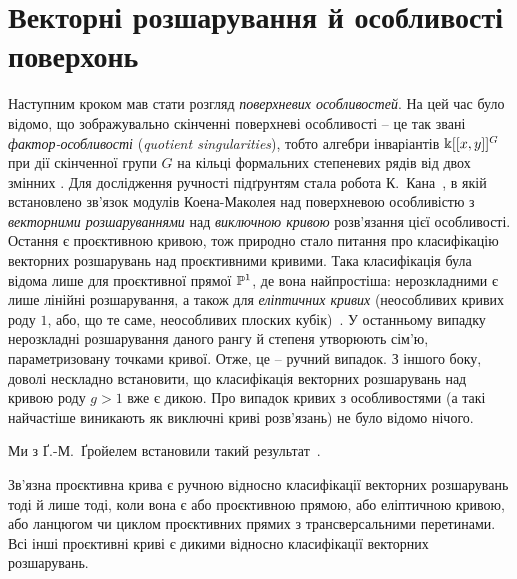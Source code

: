\section{Векторні розшарування й особливості поверхонь}
Наступним кроком мав стати розгляд \emph{поверхневих особливостей}. 
На цей час було відомо, що зображувально скінченні поверхневі особливості -- це так звані \emph{фактор-особливості} (\emph{quotient singularities}), тобто алгебри інваріантів $\Bbbk[[x,y]]^G$ при дії скінченної групи $G$ на кільці формальних степеневих рядів від двох змінних \cite{Aus-quot,Esnault}. 
Для дослідження ручності підґрунтям стала робота К.~Кана~\cite{Kahn}, в якій встановлено зв'язок модулів Коена-Маколея над поверхневою особливістю з \emph{векторними розшаруваннями} над \emph{виключною кривою} розв'язання цієї особливості. 
Остання є проєктивною кривою, тож природно стало питання про класифікацію векторних розшарувань над проєктивними кривими. 
Така класифікація була відома лише для проєктивної прямої $\mathbb{P}^1$, де вона найпростіша: нерозкладними є лише лінійні розшарування, а також для \emph{еліптичних кривих} (неособливих кривих роду $1$, або, що те саме, неособливих плоских кубік)~\cite{Atiyah}. 
У останньому випадку нерозкладні розшарування даного рангу й степеня утворюють сім'ю, параметризовану точками кривої. 
Отже, це -- ручний випадок. 
З іншого боку, доволі нескладно встановити, що класифікація векторних розшарувань над кривою роду $g>1$ вже є дикою. 
Про випадок кривих з особливостями (а такі найчастіше виникають як виключні криві розв'язань) не було відомо нічого.

Ми з Ґ.-М.~Ґройелем встановили такий результат~\cite{DG2001}.
\begin{theorem}
Зв'язна проєктивна крива є ручною відносно класифікації векторних розшарувань тоді й лише тоді, коли вона є або проєктивною прямою, або еліптичною кривою, або ланцюгом чи циклом проєктивних прямих з трансверсальними перетинами.
Всі інші проєктивні криві є дикими відносно класифікації векторних розшарувань.
\end{theorem}

